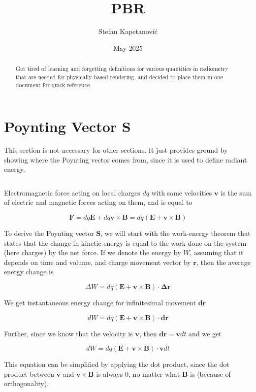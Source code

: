\documentclass{article}
\title{PBR}
\author{Stefan Kapetanović}
\date{May 2025}
\begin{document}
\maketitle

\begin{abstract}
Got tired of learning and forgetting definitions for various quantities in radiometry that are needed for physically based rendering, and decided to place them in one document for quick reference.
\end{abstract}

\section{Poynting Vector S}

This section is not necessary for other sections. It just provides ground by showing where the Poynting vector comes from, since it is used to define radiant energy.

\[\]

Electromagnetic force acting on local charges $dq$ with same velocities $\mathbf{v}$ is the sum of electric and magnetic forces acting on them, and is equal to

\[ \mathbf{F} = dq\mathbf{E} + dq\mathbf{v} \times \mathbf{B} = dq(\mathbf{E} + \mathbf{v} \times \mathbf{B}) \]

To derive the Poynting vector $\mathbf{S}$, we will start with the work-energy theorem that states that the change in kinetic energy is equal to the work done on the system (here charges) by the net force. If we denote the energy by $W$, assuming that it depends on time and volume, and charge movement vector by $\mathbf{r}$, then the average energy change is

\[ \Delta W = dq(\mathbf{E} + \mathbf{v} \times \mathbf{B}) \cdot \mathbf{\Delta r} \]

We get instantaneous energy change for infinitesimal movement $\mathbf{dr}$

\[ dW = dq(\mathbf{E} + \mathbf{v} \times \mathbf{B}) \cdot \mathbf{dr} \]

Further, since we know that the velocity is $\mathbf{v}$, then $\mathbf{dr} = \mathbf{v}dt$ and we get

\[ dW = dq(\mathbf{E} + \mathbf{v} \times \mathbf{B}) \cdot \mathbf{v}dt \]

This equation can be simplified by applying the dot product, since the dot product between $\mathbf{v}$ and $\mathbf{v} \times \mathbf{B}$ is always 0, no matter what $\mathbf{B}$ is (because of orthogonality).
\end{document}
